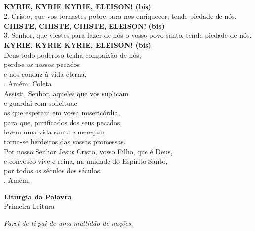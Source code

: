 \documentclass{book}
\begin{document}
\begin{flushleft}
    \vspace{.2cm} \\
    \textbf{KYRIE, KYRIE KYRIE, ELEISON! (bis)}
    \vspace{.2cm} \\
    2. Cristo, que vos tornastes pobre para nos enriquecer, tende piedade de nós.
    \vspace{.2cm} \\
    \textbf{CHISTE, CHISTE, CHISTE, ELEISON! (bis)}
    \vspace{.2cm} \\
    3. Senhor, que viestes para fazer de nós o vosso povo santo, tende piedade de nós.
    \vspace{.2cm} \\
    \textbf{KYRIE, KYRIE KYRIE, ELEISON! (bis)}
    \vspace{.2cm} \\
    Deus todo-poderoso tenha compaixão de nós, \\
    perdoe os nossos pecados \\
    e nos conduz à vida eterna. \\
    {\color{VioletRed2} \Rbar.} Amém.
    \newpage
    \textcolor{VioletRed2}{Coleta}
    \vspace{.2cm} \\
    Assisti, Senhor, aqueles que vos suplicam \\
    e guardai com solicitude \\
    os que esperam em vossa misericórdia, \\
    para que, purificados dos seus pecados, \\
    levem uma vida santa e mereçam  \\
    torna-se herdeiros das vossas promessas. \\
    Por nosso Senhor Jesus Cristo, vosso Filho, que é Deus, \\
    e convosco vive e reina, na unidade do Espírito Santo, \\
    por todos os séculos dos séculos. \\
    {\color{VioletRed2} \Rbar.} Amém. \\
\end{flushleft}
\begin{center}
    \textbf{Liturgia da Palavra}
    \vspace{.2cm}\\
    \textcolor{VioletRed2}{Primeira Leitura}
\end{center}
\begin{flushright}
    \textit{Farei de ti pai de uma multidão de nações.}
\end{flushright}
\end{document}
